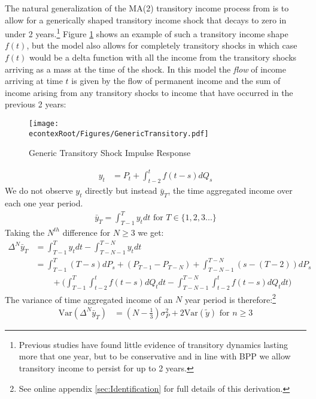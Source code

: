 \documentclass[titlepage]{\econtex}\newcommand{\texname}{ConsumptionHeterogeneity}
\begin{document}
The natural generalization of the MA(2) transitory income process from \cite{carroll_nature_1997} is to allow for a generically shaped transitory income shock that decays to zero in under 2 years.\footnote{Previous studies have found little evidence of transitory dynamics lasting more that one year, but to be conservative and in line with BPP we allow transitory income to persist for up to 2 years.} Figure \ref{fig:GenericTransitory} shows an example of such a transitory income shape $f(t)$, but the model also allows for completely transitory shocks in which case $f(t)$ would be a delta function with all the income from the transitory shocks arriving as a mass at the time of the shock. In this model the \textit{flow} of income arriving at time $t$ is given by the flow of permanent income and the sum of income arising from any transitory shocks to income that have occurred in the previous 2 years:
\begin{figure} 
	\begin{centering}
		\texttt{[image: \\econtexRoot/Figures/GenericTransitory.pdf]} 
		\caption{Generic Transitory Shock Impulse Response}
		\label{fig:GenericTransitory}
	\end{centering}
\end{figure}
\begin{align*}
y_t &= P_t + \int_{t-2}^{t} f(t-s)dQ_s
\end{align*}
We do not observe $y_t$ directly but instead $\bar{y}_T$, the time aggregated income over each one year period.
\begin{align}
\bar{y}_T = \int_{T-1}^{T} y_t dt \text{   for } T \in \{1,2,3...\}\label{income_TA}
\end{align}
Taking the $N^{th}$ difference for $N \geq 3$ we get:
\begingroup
\allowdisplaybreaks[0]
\begin{align}
\Delta^N \bar{y}_T &= \int_{T-1}^{T} y_t dt  - \int_{T-N-1}^{T-N} y_t dt  \nonumber \\ 
&= \int_{T-1}^{T} (T-s)dP_s  + (P_{T-1} - P_{T-N}) + \int_{T-N-1}^{T-N} (s-(T-2))dP_s \nonumber \\
& \qquad + \Big(\int_{T-1}^{T} \int_{t-2}^{t} f(t-s)dQ_t dt -\int_{T-N-1}^{T-N}\int_{t-2}^{t} f(t-s) dQ_t dt \Big) \label{deltaNy}
\end{align}
\endgroup
The variance of time aggregated income of an $N$ year period is therefore:\footnote{See online appendix \ref{sec:Identification} for full details of this derivation.}
\begin{align}
\mathrm{Var}(\Delta^N \bar{y}_T) &= (N-\frac{1}{3})\sigma^2_P +  2 \mathrm{Var}(\tilde{y}) \text{   for }n \geq 3 \label{variance}
\end{align}
\end{document}
